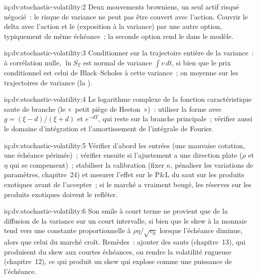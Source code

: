 \begin{solution}{iq:dv:stochastic-volatility:2}
Deux mouvements browniens, un seul actif risqué négocié~: le risque de variance ne peut pas être couvert avec l'action. Couvrir le delta avec
l'action et le  (exposition à la variance) par une autre option, typiquement de même échéance~; la seconde option rend
le  dans le modèle.
\end{solution}

\begin{solution}{iq:dv:stochastic-volatility:3}
Conditionner sur la trajectoire entière de la variance~: à corrélation nulle, $\ln S_T$ est normal de variance $\int v\,dt$, si bien que le
prix conditionnel est celui de Black--Scholes à cette variance~; on moyenne sur les trajectoires de variance (la ).
\end{solution}

\begin{solution}{iq:dv:stochastic-volatility:4}
Le logarithme complexe de la fonction caractéristique saute de branche (le «~petit piège de Heston~»)~: utiliser la forme avec
$g=(\xi-d)/(\xi+d)$ et $e^{-dT}$, qui reste sur la branche principale~; vérifier aussi le domaine d'intégration et
l'amortissement de l'intégrale de Fourier.
\end{solution}

\begin{solution}{iq:dv:stochastic-volatility:5}
Vérifier d'abord les entrées (une mauvaise cotation, une échéance périmée)~; vérifier ensuite si l'ajustement a une direction plate ($\rho$ et $\eta$
qui se compensent)~; stabiliser la calibration (fixer $\kappa$, pénaliser les variations de paramètres, chapitre~24) et mesurer l'effet sur le P\&L
du saut sur les produits exotiques avant de l'accepter~; si le marché a vraiment bougé, les réserves sur les produits exotiques doivent le refléter.
\end{solution}

\begin{solution}{iq:dv:stochastic-volatility:6}
Son smile à court terme ne provient que de la diffusion de la variance sur un court intervalle, si bien que le skew à la monnaie tend vers une
constante proportionnelle à $\rho\eta/\sqrt{v_0}$ lorsque l'échéance diminue, alors que celui du marché croît. Remèdes~: ajouter des sauts
(chapitre~13), qui produisent du skew aux courtes échéances, ou rendre la volatilité rugueuse (chapitre~12), ce qui produit un skew
qui explose comme une puissance de l'échéance.
\end{solution}
